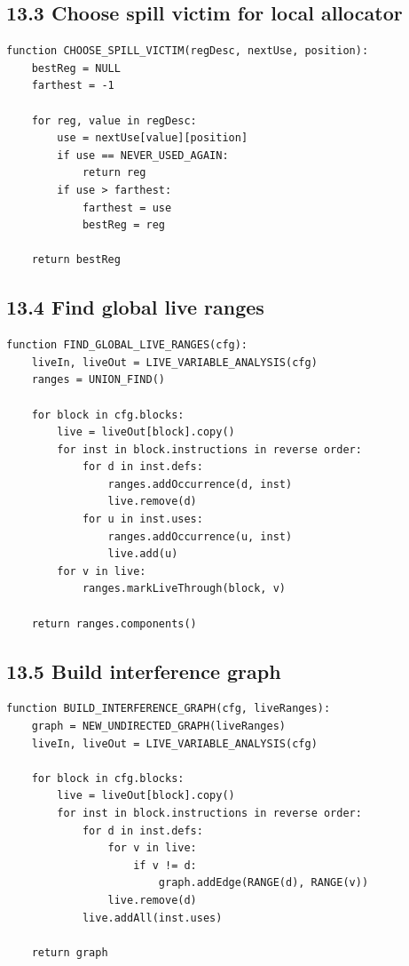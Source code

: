 \documentclass[10pt,letterpaper]{article}
\begin{document}
\subsection*{13.3 Choose spill victim for local allocator}
{}

\begin{verbatim}
function CHOOSE_SPILL_VICTIM(regDesc, nextUse, position):
    bestReg = NULL
    farthest = -1

    for reg, value in regDesc:
        use = nextUse[value][position]
        if use == NEVER_USED_AGAIN:
            return reg
        if use > farthest:
            farthest = use
            bestReg = reg

    return bestReg
\end{verbatim}

\subsection*{13.4 Find global live ranges}
{}

\begin{verbatim}
function FIND_GLOBAL_LIVE_RANGES(cfg):
    liveIn, liveOut = LIVE_VARIABLE_ANALYSIS(cfg)
    ranges = UNION_FIND()

    for block in cfg.blocks:
        live = liveOut[block].copy()
        for inst in block.instructions in reverse order:
            for d in inst.defs:
                ranges.addOccurrence(d, inst)
                live.remove(d)
            for u in inst.uses:
                ranges.addOccurrence(u, inst)
                live.add(u)
        for v in live:
            ranges.markLiveThrough(block, v)

    return ranges.components()
\end{verbatim}

\subsection*{13.5 Build interference graph}
{}

\begin{verbatim}
function BUILD_INTERFERENCE_GRAPH(cfg, liveRanges):
    graph = NEW_UNDIRECTED_GRAPH(liveRanges)
    liveIn, liveOut = LIVE_VARIABLE_ANALYSIS(cfg)

    for block in cfg.blocks:
        live = liveOut[block].copy()
        for inst in block.instructions in reverse order:
            for d in inst.defs:
                for v in live:
                    if v != d:
                        graph.addEdge(RANGE(d), RANGE(v))
                live.remove(d)
            live.addAll(inst.uses)

    return graph
\end{verbatim}
\end{document}
